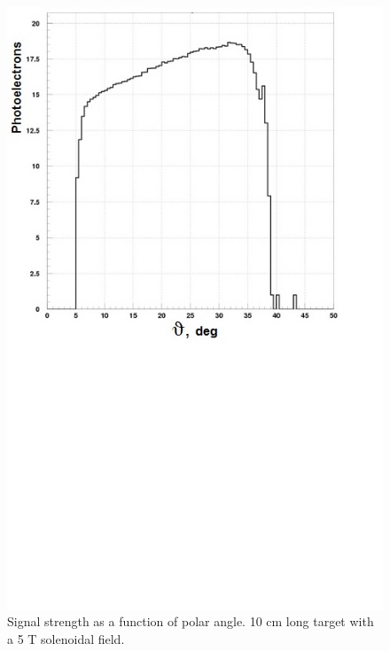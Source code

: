 \begin{figure}[!ht]
    \centering
    \includegraphics[width=1.0\linewidth,trim={0.0cm 9.4cm 0.0cm 0.0cm},clip]{images/10cm_Targ_5T_Field_Theta.jpg}
    \caption{Signal strength as a function of polar angle. 10 cm long target with a 5 T solenoidal field.}
    \label{fig:10cm_Targ_5T_Field_Theta}
\end{figure}

